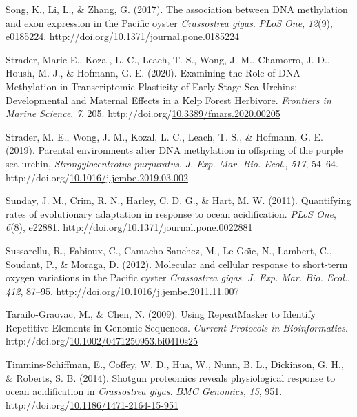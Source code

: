 \documentclass [11pt, proquest] {uwthesis}[2015/03/03]
\newlength{\cslhangindent}
\newenvironment{CSLReferences}%
{\setlength{\parindent}{0pt}%
\everypar{\setlength{\hangindent}{\cslhangindent}}\ignorespaces}%
{\par}
\begin{document}
\begin{CSLReferences}{1}{0}
\leavevmode\hypertarget{ref-Song2017}{}%
Song, K., Li, L., \& Zhang, G. (2017). {The association between DNA methylation and exon expression in the Pacific oyster \emph{Crassostrea gigas}}. \emph{PLoS One}, \emph{12}(9), e0185224. http://doi.org/\href{https://doi.org/10.1371/journal.pone.0185224}{10.1371/journal.pone.0185224}

\leavevmode\hypertarget{ref-Strader2020}{}%
Strader, Marie E., Kozal, L. C., Leach, T. S., Wong, J. M., Chamorro, J. D., Housh, M. J., \& Hofmann, G. E. (2020). {Examining the Role of DNA Methylation in Transcriptomic Plasticity of Early Stage Sea Urchins: Developmental and Maternal Effects in a Kelp Forest Herbivore}. \emph{Frontiers in Marine Science}, \emph{7}, 205. http://doi.org/\href{https://doi.org/10.3389/fmars.2020.00205}{10.3389/fmars.2020.00205}

\leavevmode\hypertarget{ref-Strader2019}{}%
Strader, M. E., Wong, J. M., Kozal, L. C., Leach, T. S., \& Hofmann, G. E. (2019). {Parental environments alter DNA methylation in offspring of the purple sea urchin, \emph{Strongylocentrotus purpuratus}}. \emph{J. Exp. Mar. Bio. Ecol.}, \emph{517}, 54--64. http://doi.org/\href{https://doi.org/10.1016/j.jembe.2019.03.002}{10.1016/j.jembe.2019.03.002}

\leavevmode\hypertarget{ref-Sunday2011}{}%
Sunday, J. M., Crim, R. N., Harley, C. D. G., \& Hart, M. W. (2011). {Quantifying rates of evolutionary adaptation in response to ocean acidification}. \emph{PLoS One}, \emph{6}(8), e22881. http://doi.org/\href{https://doi.org/10.1371/journal.pone.0022881}{10.1371/journal.pone.0022881}

\leavevmode\hypertarget{ref-Sussarellu2012}{}%
Sussarellu, R., Fabioux, C., Camacho Sanchez, M., Le Goı̈c, N., Lambert, C., Soudant, P., \& Moraga, D. (2012). {Molecular and cellular response to short-term oxygen variations in the Pacific oyster \emph{Crassostrea gigas}}. \emph{J. Exp. Mar. Bio. Ecol.}, \emph{412}, 87--95. http://doi.org/\href{https://doi.org/10.1016/j.jembe.2011.11.007}{10.1016/j.jembe.2011.11.007}

\leavevmode\hypertarget{ref-Tarailo-Graovac2009}{}%
Tarailo-Graovac, M., \& Chen, N. (2009). {Using RepeatMasker to Identify Repetitive Elements in Genomic Sequences}. \emph{Current Protocols in Bioinformatics}. http://doi.org/\href{https://doi.org/10.1002/0471250953.bi0410s25}{10.1002/0471250953.bi0410s25}

\leavevmode\hypertarget{ref-Timmins-Schiffman2014}{}%
Timmins-Schiffman, E., Coffey, W. D., Hua, W., Nunn, B. L., Dickinson, G. H., \& Roberts, S. B. (2014). {Shotgun proteomics reveals physiological response to ocean acidification in \emph{Crassostrea gigas}}. \emph{BMC Genomics}, \emph{15}, 951. http://doi.org/\href{https://doi.org/10.1186/1471-2164-15-951}{10.1186/1471-2164-15-951}


\end{CSLReferences}
\end{document}
